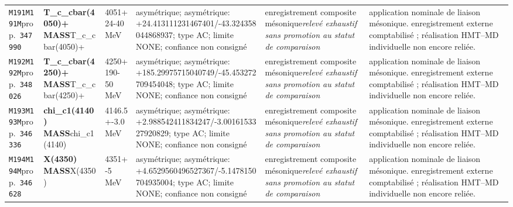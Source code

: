 \begin{landscape}
\begin{longtable}{L{1.85cm}L{4.45cm}L{2.35cm}L{4.05cm}L{3.35cm}L{7.15cm}}
\texttt{M191}\newline \texttt{M191M}\newline prop.\ \texttt{347990} & \textbf{T\_\allowbreak{}c\_\allowbreak{}cbar(4050)+ MASS}\newline T\_\allowbreak{}c\_\allowbreak{}cbar(4050)+ & 4051+24-40\,MeV & asymétrique; asymétrique: +24.413111231467401/-43.324358044868937; type AC; limite NONE; confiance non consigné & enregistrement composite mésonique\newline \emph{relevé exhaustif sans promotion au statut de comparaison} & application nominale de liaison mésonique. enregistrement externe comptabilisé ; réalisation HMT--MD individuelle non encore reliée. \\
\texttt{M192}\newline \texttt{M192M}\newline prop.\ \texttt{348026} & \textbf{T\_\allowbreak{}c\_\allowbreak{}cbar(4250)+ MASS}\newline T\_\allowbreak{}c\_\allowbreak{}cbar(4250)+ & 4250+190-50\,MeV & asymétrique; asymétrique: +185.29975715040749/-45.453272709454048; type AC; limite NONE; confiance non consigné & enregistrement composite mésonique\newline \emph{relevé exhaustif sans promotion au statut de comparaison} & application nominale de liaison mésonique. enregistrement externe comptabilisé ; réalisation HMT--MD individuelle non encore reliée. \\
\texttt{M193}\newline \texttt{M193M}\newline prop.\ \texttt{346336} & \textbf{chi\_\allowbreak{}c1(4140) MASS}\newline chi\_\allowbreak{}c1(4140) & 4146.5+-3.0\,MeV & asymétrique; asymétrique: +2.988542411834247/-3.0016153327920829; type AC; limite NONE; confiance non consigné & enregistrement composite mésonique\newline \emph{relevé exhaustif sans promotion au statut de comparaison} & application nominale de liaison mésonique. enregistrement externe comptabilisé ; réalisation HMT--MD individuelle non encore reliée. \\
\texttt{M194}\newline \texttt{M194M}\newline prop.\ \texttt{346628} & \textbf{X(4350) MASS}\newline X(4350) & 4351+-5\,MeV & asymétrique; asymétrique: +4.6529560496527367/-5.1478150704935004; type AC; limite NONE; confiance non consigné & enregistrement composite mésonique\newline \emph{relevé exhaustif sans promotion au statut de comparaison} & application nominale de liaison mésonique. enregistrement externe comptabilisé ; réalisation HMT--MD individuelle non encore reliée. \\

\end{longtable}
\end{landscape}
